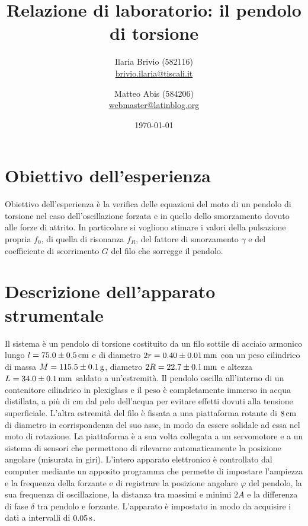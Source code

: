 \documentclass[italian,a4paper]{article}
\begin{document}
\title{Relazione di laboratorio: il pendolo di torsione}
\author{\normalsize Ilaria Brivio (582116)\\%
\normalsize \url{brivio.ilaria@tiscali.it}%
\and %
\normalsize Matteo Abis (584206)\\ %
\normalsize \url{webmaster@latinblog.org}}
\date{\today}
\maketitle
\section{Obiettivo dell'esperienza}
Obiettivo dell'esperienza è la verifica delle equazioni del moto di un pendolo di torsione nel caso dell'oscillazione forzata e in quello dello smorzamento dovuto alle forze di attrito. In particolare si vogliono stimare i valori della pulsazione propria $f_0$, di quella di risonanza $f_R$, del fattore di smorzamento $\gamma$ e del coefficiente di scorrimento $G$ del filo che sorregge il pendolo.
\section{Descrizione dell'apparato strumentale}
Il sistema è un pendolo di torsione costituito da un filo sottile di acciaio armonico lungo $l=\unit[75.0 \pm 0.5]{cm}$ e di diametro $2r=\unit[0.40 \pm 0.01]{mm}$ con un peso cilindrico di massa $M=\unit[115.5 \pm 0.1]{g}$, diametro $2R=\unit[22.7 \pm 0.1]{mm}$ e altezza $L=\unit[34.0 \pm 0.1]{mm}$ saldato a un'estremità. Il pendolo oscilla all'interno di un contenitore cilindrico in plexiglass e il peso è completamente immerso in acqua distillata, a più di \unit[1]{cm} dal pelo dell'acqua per evitare effetti dovuti alla tensione superficiale. L'altra estremità del filo è fissata a una piattaforma rotante di $\unit[8]{cm}$ di diametro in corrispondenza del suo asse, in modo da essere solidale ad essa nel moto di rotazione. La piattaforma è a sua volta collegata a un servomotore e a un sistema di sensori che permettono di rilevarne automaticamente la posizione angolare (misurata in giri). L'intero apparato elettronico è controllato dal computer mediante un apposito programma che permette di impostare l'ampiezza  e la frequenza della forzante e di registrare la posizione angolare $\varphi$ del pendolo, la sua frequenza di oscillazione, la distanza tra massimi e minimi $2A$  e la differenza di fase $\delta$  tra pendolo e forzante. L'apparato è impostato in modo da acquisire i dati a intervalli di $\unit[0.05]{s}$.
\end{document}
